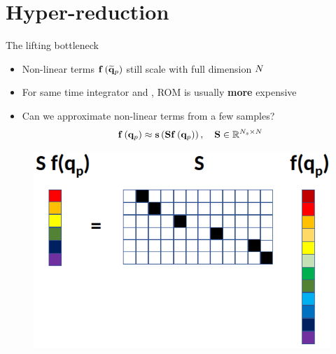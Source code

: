 \documentclass[]{beamer}
\begin{document}
\section*{Hyper-reduction}

\begin{frame}{The lifting bottleneck}
    \begin{itemize}
		\item Non-linear terms $\mathbf{f} \left(\mathbf{\widetilde{q}}_{p}\right)$ still scale with full dimension $N$
		\item For same time integrator and \dt, ROM is usually \textbf{more} expensive
		\item Can we approximate non-linear terms from a few samples?
		\begin{equation*}
			\mathbf{f} \left(\mathbf{q}_{p}\right) \approx \mathbf{s}\left(\mathbf{S} \mathbf{f} \left(\mathbf{q}_{p}\right)\right), \quad \mathbf{S} \in \mathbb{R}^{N_s \times N}
		\end{equation*}
	\end{itemize}
	\vspace{1em}
	\begin{figure}
		\centering
		\includegraphics[width=0.55\linewidth]{theory/samplingHelperVis.png}
	\end{figure}
\end{frame}
\end{document}
